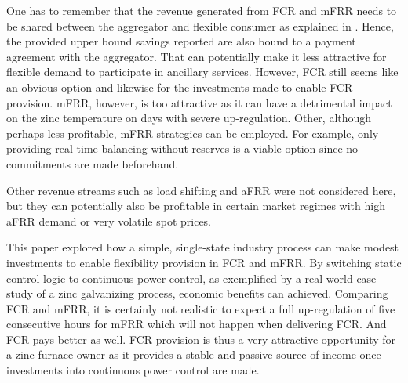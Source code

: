 \documentclass[lettersize,journal]{IEEEtran}
\begin{document}
One has to remember that the revenue generated from FCR and mFRR needs to be shared between the aggregator and flexible consumer as explained in \cite{gade2022ecosystem}. Hence, the provided upper bound savings reported are also bound to a payment agreement with the aggregator. That can potentially make it less attractive for flexible demand to participate in ancillary services. However, FCR still seems like an obvious option and likewise for the investments made to enable FCR provision. mFRR, however, is too attractive as it can have a detrimental impact on the zinc temperature on days with severe up-regulation. Other, although perhaps less profitable, mFRR strategies can be employed. For example, only providing real-time balancing without reserves is a viable option since no commitments are made beforehand.

Other revenue streams such as load shifting and aFRR were not considered here, but they can potentially also be profitable in certain market regimes with high aFRR demand or very volatile spot prices.



This paper explored how a simple, single-state industry process can make modest investments to enable flexibility provision in FCR and mFRR. By switching static control logic to continuous power control, as exemplified by a real-world case study of a zinc galvanizing process, economic benefits can achieved. Comparing FCR and mFRR, it is certainly not realistic to expect a full up-regulation of five consecutive hours for mFRR which will not happen when delivering FCR. And FCR pays better as well. FCR provision is thus a very attractive opportunity for a zinc furnace owner as it provides a stable and passive source of income once investments into continuous power control are made.

% 





% 


\end{document}
